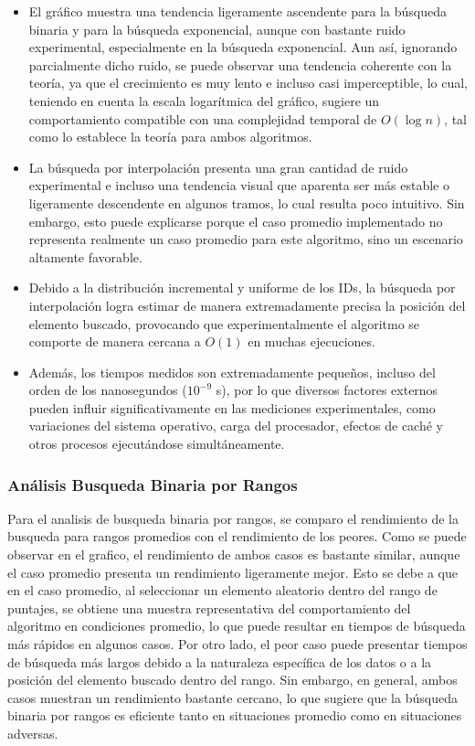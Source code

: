 \begin{itemize}
    \item El gráfico muestra una tendencia ligeramente ascendente para la búsqueda binaria y para la búsqueda exponencial, 
          aunque con bastante ruido experimental, especialmente en la búsqueda exponencial.  Aun así, ignorando parcialmente 
          dicho ruido, se puede observar una tendencia coherente con la teoría, ya que el crecimiento es muy lento e incluso 
          casi imperceptible, lo cual, teniendo en cuenta la escala logarítmica del gráfico, sugiere un comportamiento compatible 
          con una complejidad temporal de $O(\log n)$, tal como lo establece la teoría para ambos algoritmos.

    \item La búsqueda por interpolación presenta una gran cantidad de ruido experimental e incluso una tendencia visual que 
          aparenta ser más estable o ligeramente descendente en algunos tramos, lo cual resulta poco intuitivo.  Sin embargo, 
          esto puede explicarse porque el caso promedio implementado no representa realmente un caso promedio para este algoritmo, 
          sino un escenario altamente favorable.

    \item Debido a la distribución incremental y uniforme de los IDs, la búsqueda por interpolación logra estimar de manera 
          extremadamente precisa la posición del elemento buscado, provocando que experimentalmente el algoritmo se comporte 
          de manera cercana a $O(1)$ en muchas ejecuciones.

    \item Además, los tiempos medidos son extremadamente pequeños, incluso del orden de los nanosegundos ($10^{-9}$ s), por lo 
          que diversos factores externos pueden influir significativamente en las mediciones experimentales, como variaciones 
          del sistema operativo, carga del procesador, efectos de caché y otros procesos ejecutándose simultáneamente.
\end{itemize}

\subsubsection{Análisis Busqueda Binaria por Rangos}
Para el analisis de busqueda binaria por rangos, se comparo el rendimiento de la busqueda para rangos promedios con el rendimiento de los peores. Como se puede observar en el grafico, el rendimiento de ambos casos es bastante similar, aunque el caso promedio presenta un rendimiento ligeramente mejor. Esto se debe a que en el caso promedio, al seleccionar un elemento aleatorio dentro del rango de puntajes, se obtiene una muestra representativa del comportamiento del algoritmo en condiciones promedio, lo que puede resultar en tiempos de búsqueda más rápidos en algunos casos. Por otro lado, el peor caso puede presentar tiempos de búsqueda más largos debido a la naturaleza específica de los datos o a la posición del elemento buscado dentro del rango. Sin embargo, en general, ambos casos muestran un rendimiento bastante cercano, lo que sugiere que la búsqueda binaria por rangos es eficiente tanto en situaciones promedio como en situaciones adversas.

